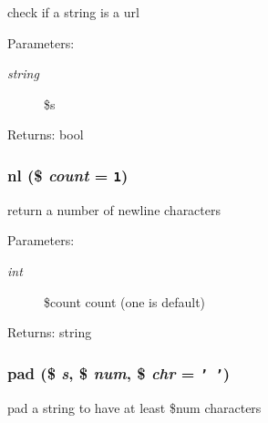 check if a string is a url

\begin{Desc}
\item[Parameters:]
\begin{description}
\item[{\em string}]\$s \end{description}
\end{Desc}
\begin{Desc}
\item[Returns:]bool \end{Desc}
\hypertarget{util_8inc_8php_9f9eeab2eb9a39518e80609fc7f83842}{
\subsubsection[{nl}]{\setlength{\rightskip}{0pt plus 5cm}nl (\$ {\em count} = {\tt 1})}}
\label{util_8inc_8php_9f9eeab2eb9a39518e80609fc7f83842}


return a number of newline characters

\begin{Desc}
\item[Parameters:]
\begin{description}
\item[{\em int}]\$count count (one is default) \end{description}
\end{Desc}
\begin{Desc}
\item[Returns:]string \end{Desc}
\hypertarget{util_8inc_8php_37ef346387afe0af2cf86a8bea887173}{
\subsubsection[{pad}]{\setlength{\rightskip}{0pt plus 5cm}pad (\$ {\em s}, \/  \$ {\em num}, \/  \$ {\em chr} = {\tt '~'})}}
\label{util_8inc_8php_37ef346387afe0af2cf86a8bea887173}


pad a string to have at least \$num characters


